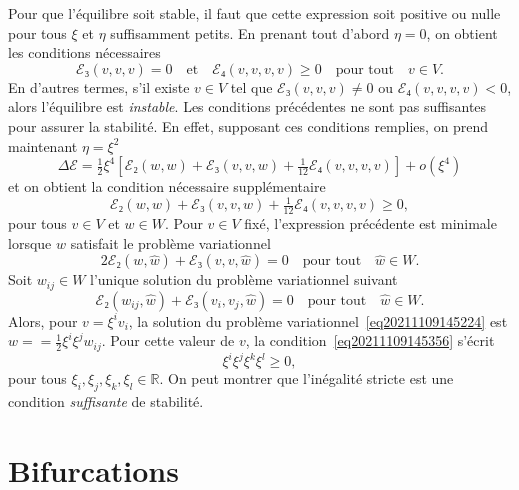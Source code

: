 \documentclass[12pt, final]{amsart}
\theoremstyle{definition}
\begin{document}
Pour que l'équilibre soit stable, il faut que cette expression soit
positive ou nulle pour tous $ξ$ et $η$ suffisamment petits. En prenant
tout d'abord $η = 0$, on obtient les conditions nécessaires
\begin{equation}
  \label{eq20211108164416} ℰ₃ (v, v, v) = 0 \quad \text{et} \quad
  ℰ₄ (v, v, v, v) \geq 0 \quad \text{pour tout} \quad v∈V.
\end{equation}
En d'autres termes, s'il existe $v∈V$ tel que $ℰ₃ (v, v, v)
\neq 0$ ou $ℰ₄ (v, v, v, v) < 0$, alors l'équilibre est
\emph{instable}. Les conditions précédentes ne sont pas suffisantes
pour assurer la stabilité. En effet, supposant ces conditions remplies, on
prend maintenant $η = ξ^2$
\begin{equation}
  \Delta ℰ= \tfrac{1}{2} ξ^4  \left[ ℰ₂ (w, w)
  +ℰ₃ (v, v, w) + \tfrac{1}{12} ℰ₄ (v, v, v, v) \right]
  + o (ξ^4)
\end{equation}
et on obtient la condition nécessaire supplémentaire
\begin{equation}
  \label{eq20211109145356} ℰ₂ (w, w) +ℰ₃ (v, v, w) +
  \tfrac{1}{12} ℰ₄ (v, v, v, v) \geq 0,
\end{equation}
pour tous $v∈V$ et $w∈W$. Pour $v∈V$ fixé, l'expression
précédente est minimale lorsque $w$ satisfait le problème
variationnel
\begin{equation}
  \label{eq20211109145224} 2ℰ₂ (w, \hat{w}) +ℰ₃ (v, v,
  \hat{w}) = 0 \quad \text{pour tout} \quad \hat{w}∈W.
\end{equation}
Soit $w_{i  j}∈W$ l'unique solution du problème variationnel
suivant
\begin{equation}
  \label{eq:pbvar wij} ℰ₂ (w_{i  j}, \hat{w})
  +ℰ₃ (v_i, v_j, \hat{w}) = 0 \quad \text{pour tout} \quad \hat{w}
 ∈W.
\end{equation}
Alors, pour $v = ξ^i v_i$, la solution du problème
variationnel~\eqref{eq20211109145224} est $w = = \tfrac{1}{2} ξ^i ξ^j w_{i
 j}$. Pour cette valeur de $v$, la condition~\eqref{eq20211109145356}
s'écrit
\begin{equation}
  [ℰ₄ (v_i, v_j, v_k, v_l) - 3ℰ₂ (w_{i  j}, w_{k
   l})] ξ^i ξ^j ξ^k ξ^l \geq 0,
\end{equation}
pour tous $ξ_i, ξ_j, ξ_k, ξ_l∈\mathbb{R}$. On peut montrer que
l'inégalité stricte est une condition \emph{suffisante} de
stabilité.

\section{Bifurcations}
\end{document}
